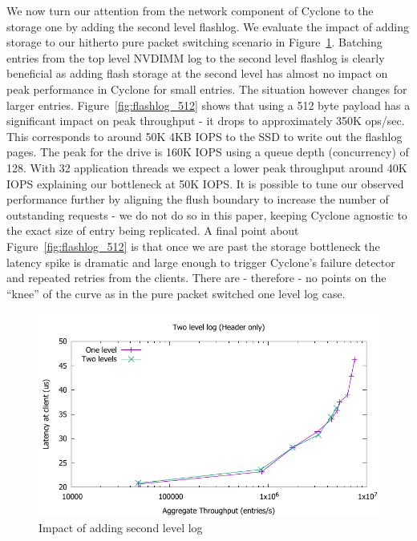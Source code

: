 \documentclass[10pt, preprint, nonatbib]{sigplanconf}
\begin{document}
We now turn our attention from the network component of Cyclone to the storage
one by adding the second level flashlog. We evaluate the impact of adding
storage to our hitherto pure packet switching scenario in
Figure~\ref{fig:flashlog}. Batching entries from the top level NVDIMM log to the
second level flashlog is clearly beneficial as adding flash storage at the
second level has almost no impact on peak performance in Cyclone for small
entries. The situation however changes for larger
entries. Figure~\ref{fig:flashlog_512} shows that using a 512 byte payload has a
significant impact on peak throughput - it drops to approximately 350K
ops/sec. This corresponds to around 50K 4KB IOPS to the SSD to write out the
flashlog pages. The peak for the drive is 160K IOPS using a queue depth
(concurrency) of 128. With 32 application threads we expect a lower peak
throughput around 40K IOPS explaining our bottleneck at 50K IOPS.  It is
possible to tune our observed performance further by aligning the flush boundary
to increase the number of outstanding requests - we do not do so in this paper,
keeping Cyclone agnostic to the exact size of entry being replicated. A final
point about Figure~\ref{fig:flashlog_512} is that once we are past the storage
bottleneck the latency spike is dramatic and large enough to trigger Cyclone's
failure detector and repeated retries from the clients. There are - therefore -
no points on the ``knee'' of the curve as in the pure packet switched one level
log case.

\begin{figure}
\includegraphics[scale=0.6]{results2/flashlog.pdf}
\caption{Impact of adding second level log}
\label{fig:flashlog}
\end{figure}
\end{document}
